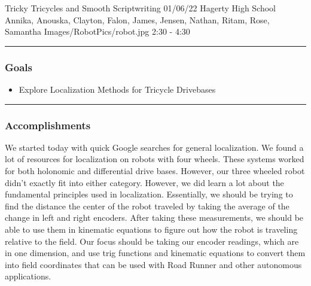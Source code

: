 \insertmeeting 
	{Tricky Tricycles and Smooth Scriptwriting} 
	{01/06/22} 
	{Hagerty High School}
	{Annika, Anouska, Clayton, Falon, James, Jensen, Nathan, Ritam, Rose, Samantha}
	{Images/RobotPics/robot.jpg}
	{2:30 - 4:30}
	
\noindent\hfil\rule{\textwidth}{.4pt}\hfil
\subsubsection*{Goals}
\begin{itemize}
    \item Explore Localization Methods for Tricycle Drivebases

\end{itemize} 

\noindent\hfil\rule{\textwidth}{.4pt}\hfil

\subsubsection*{Accomplishments}
We started today with quick Google searches for general localization. We found a lot of resources for localization on robots with four wheels. These systems worked for both holonomic and differential drive bases. However, our three wheeled robot didn't exactly fit into either category. However, we did learn a lot about the fundamental principles used in localization. Essentially, we should be trying to find the distance the center of the robot traveled by taking the average of the change in left and right encoders. After taking these measurements, we should be able to use them in kinematic equations to figure out how the robot is traveling relative to the field. Our focus should be taking our encoder readings, which are in one dimension, and use trig functions and kinematic equations to convert them into field coordinates that can be used with Road Runner and other autonomous applications. 

